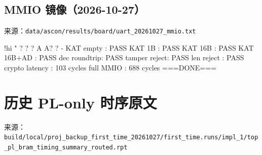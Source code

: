 \Needspace{85pt}

\subsection{MMIO 镜像（2026-10-27）}\label{mmio-ux955cux50cf2026-10-27}

来源：\texttt{data/\allowbreak{}ascon/\allowbreak{}results/\allowbreak{}board/\allowbreak{}uart\_\allowbreak{}20261027\_\allowbreak{}mmio.\allowbreak{}txt}

\begin{codeblock}
!hi 
"
?
?
?
A
A?
?
-
KAT empty   : PASS
KAT 1B      : PASS
KAT 16B     : PASS
KAT 16B+AD  : PASS
dec roundtrip: PASS
tamper reject: PASS
len reject  : PASS
crypto latency : 103 cycles
full MMIO      : 688 cycles
===DONE===
\end{codeblock}

\Needspace{85pt}

\section{历史 PL-only 时序原文}\label{ux5386ux53f2-pl-only-ux65f6ux5e8fux539fux6587}

来源：\texttt{build/\allowbreak{}local/\allowbreak{}proj\_\allowbreak{}backup\_\allowbreak{}first\_\allowbreak{}time\_\allowbreak{}20261027/\allowbreak{}first\_\allowbreak{}time.\allowbreak{}runs/\allowbreak{}impl\_\allowbreak{}1/\allowbreak{}top\_\allowbreak{}pl\_\allowbreak{}bram\_\allowbreak{}timing\_\allowbreak{}summary\_\allowbreak{}routed.\allowbreak{}rpt}

